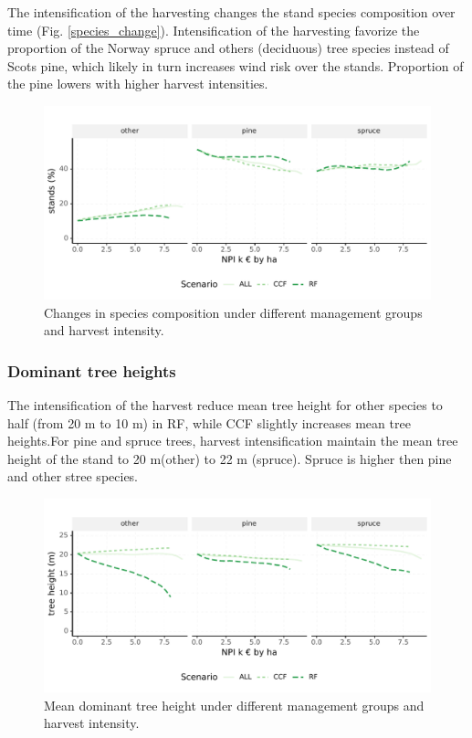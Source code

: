 \documentclass[]{elsarticle} %
\makeatletter
\def\maxwidth{\ifdim\Gin@nat@width>\linewidth\linewidth
\else\Gin@nat@width\fi}
\let\Oldincludegraphics\includegraphics
\renewcommand{\includegraphics}[1]{\Oldincludegraphics[width=\maxwidth]{#1}}
\makeatother
\begin{document}
The intensification of the harvesting changes the stand species
composition over time (Fig. \ref{species_change}). Intensification of
the harvesting favorize the proportion of the Norway spruce and others
(deciduous) tree species instead of Scots pine, which likely in turn
increases wind risk over the stands. Proportion of the pine lowers with
higher harvest intensities.

\begin{figure}
\centering
\includegraphics{test_manus_files/figure-latex/species_change-1.pdf}
\caption{Changes in species composition under different management
groups and harvest intensity.}
\end{figure}

\hypertarget{dominant-tree-heights}{%
\subsubsection{Dominant tree heights}\label{dominant-tree-heights}}

The intensification of the harvest reduce mean tree height for other
species to half (from 20 m to 10 m) in RF, while CCF slightly increases
mean tree heights.For pine and spruce trees, harvest intensification
maintain the mean tree height of the stand to 20 m(other) to 22 m
(spruce). Spruce is higher then pine and other stree species.

\begin{figure}
\centering
\includegraphics{test_manus_files/figure-latex/res_D_tree_height-1.pdf}
\caption{Mean dominant tree height under different management groups and
harvest intensity.}
\end{figure}
\end{document}
